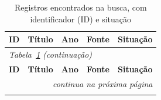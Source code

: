 \begingroup
\scriptsize
\setlength{\tabcolsep}{2.5pt}
\renewcommand{\arraystretch}{1.1}
\begin{longtable}{|l|p{6.4cm}|l|p{3.1cm}|p{3.2cm}|}
\caption[Registros encontrados na busca]{Registros encontrados na busca, com identificador (ID) e situa\c{c}\~ao}\label{tab:registros-118}\\ \hline
\textbf{ID} & \textbf{T\'itulo} & \textbf{Ano} & \textbf{Fonte} & \textbf{Situa\c{c}\~ao} \\ \hline
\endfirsthead
\multicolumn{5}{l}{\scriptsize\textit{Tabela~\ref{tab:registros-118} (continua\c{c}\~ao)}}\\ \hline
\textbf{ID} & \textbf{T\'itulo} & \textbf{Ano} & \textbf{Fonte} & \textbf{Situa\c{c}\~ao} \\ \hline
\endhead

\multicolumn{5}{r}{\scriptsize\textit{continua na pr\'oxima p\'agina}}\\ 
\endfoot


\end{longtable}
